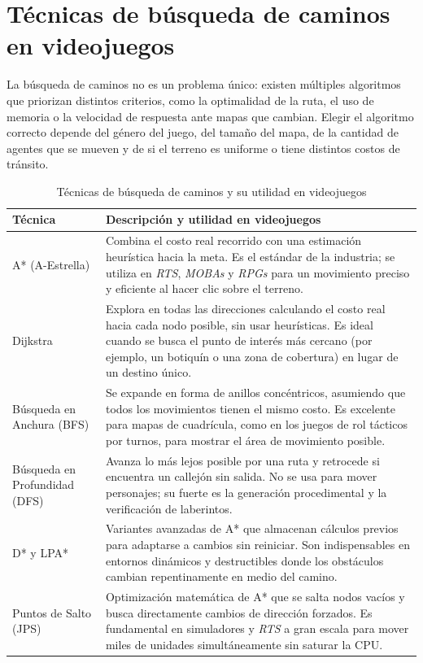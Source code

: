 \documentclass[12pt,letterpaper]{article}
\begin{document}
\section{Técnicas de búsqueda de caminos en videojuegos}

La búsqueda de caminos no es un problema único: existen múltiples algoritmos que priorizan distintos criterios, como la optimalidad de la ruta, el uso de memoria o la velocidad de respuesta ante mapas que cambian. Elegir el algoritmo correcto depende del género del juego, del tamaño del mapa, de la cantidad de agentes que se mueven y de si el terreno es uniforme o tiene distintos costos de tránsito.

\begin{table}[H]
\centering
\caption{Técnicas de búsqueda de caminos y su utilidad en videojuegos}
\small
\begin{tabularx}{\textwidth}{L{4.0cm}Y}
\toprule
\textbf{Técnica} & \textbf{Descripción y utilidad en videojuegos} \\
\midrule
A* (A-Estrella) &
Combina el costo real recorrido con una estimación heurística hacia la meta. Es el estándar de la industria; se utiliza en \textit{RTS}, \textit{MOBAs} y \textit{RPGs} para un movimiento preciso y eficiente al hacer clic sobre el terreno. \\
\addlinespace
Dijkstra &
Explora en todas las direcciones calculando el costo real hacia cada nodo posible, sin usar heurísticas. Es ideal cuando se busca el punto de interés más cercano (por ejemplo, un botiquín o una zona de cobertura) en lugar de un destino único. \\
\addlinespace
Búsqueda en Anchura (BFS) &
Se expande en forma de anillos concéntricos, asumiendo que todos los movimientos tienen el mismo costo. Es excelente para mapas de cuadrícula, como en los juegos de rol tácticos por turnos, para mostrar el área de movimiento posible. \\
\addlinespace
Búsqueda en Profundidad (DFS) &
Avanza lo más lejos posible por una ruta y retrocede si encuentra un callejón sin salida. No se usa para mover personajes; su fuerte es la generación procedimental y la verificación de laberintos. \\
\addlinespace
D* y LPA* &
Variantes avanzadas de A* que almacenan cálculos previos para adaptarse a cambios sin reiniciar. Son indispensables en entornos dinámicos y destructibles donde los obstáculos cambian repentinamente en medio del camino. \\
\addlinespace
Puntos de Salto (JPS) &
Optimización matemática de A* que se salta nodos vacíos y busca directamente cambios de dirección forzados. Es fundamental en simuladores y \textit{RTS} a gran escala para mover miles de unidades simultáneamente sin saturar la CPU. \\

\end{tabularx}
\end{table}
\end{document}
